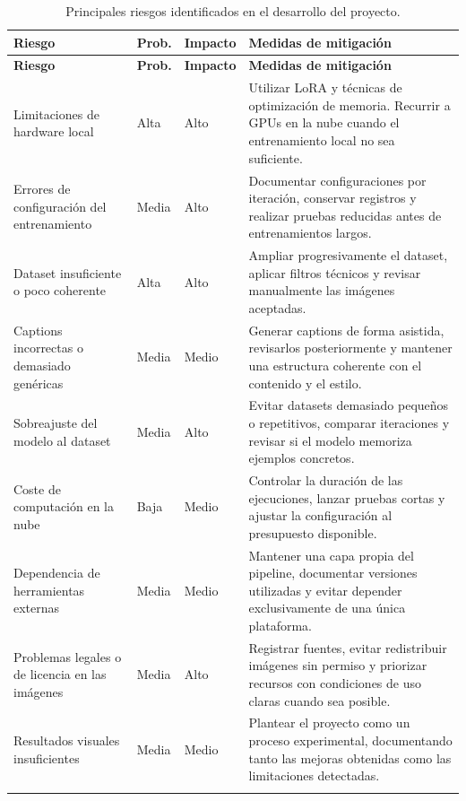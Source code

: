 \documentclass[a4paper,11pt,titlepage]{scrbook}
\newcommand{\estilotabla}{%
    \small
    \setlength{\tabcolsep}{4pt}
    \renewcommand{\arraystretch}{1.15}
}
\begin{document}
\begingroup
\estilotabla
\begin{longtable}{|L{0.25\textwidth}|C{0.12\textwidth}|C{0.12\textwidth}|L{0.39\textwidth}|}
\hline
\textbf{Riesgo} & \textbf{Prob.} & \textbf{Impacto} & \textbf{Medidas de mitigación} \\
\hline
\endfirsthead

\hline
\textbf{Riesgo} & \textbf{Prob.} & \textbf{Impacto} & \textbf{Medidas de mitigación} \\
\hline
\endhead

Limitaciones de hardware local &
Alta &
Alto &
Utilizar LoRA y técnicas de optimización de memoria. Recurrir a GPUs en la nube cuando el entrenamiento local no sea suficiente. \\
\hline

Errores de configuración del entrenamiento &
Media &
Alto &
Documentar configuraciones por iteración, conservar registros y realizar pruebas reducidas antes de entrenamientos largos. \\
\hline

Dataset insuficiente o poco coherente &
Alta &
Alto &
Ampliar progresivamente el dataset, aplicar filtros técnicos y revisar manualmente las imágenes aceptadas. \\
\hline

Captions incorrectas o demasiado genéricas &
Media &
Medio &
Generar captions de forma asistida, revisarlos posteriormente y mantener una estructura coherente con el contenido y el estilo. \\
\hline

Sobreajuste del modelo al dataset &
Media &
Alto &
Evitar datasets demasiado pequeños o repetitivos, comparar iteraciones y revisar si el modelo memoriza ejemplos concretos. \\
\hline

Coste de computación en la nube &
Baja &
Medio &
Controlar la duración de las ejecuciones, lanzar pruebas cortas y ajustar la configuración al presupuesto disponible. \\
\hline

Dependencia de herramientas externas &
Media &
Medio &
Mantener una capa propia del pipeline, documentar versiones utilizadas y evitar depender exclusivamente de una única plataforma. \\
\hline

Problemas legales o de licencia en las imágenes &
Media &
Alto &
Registrar fuentes, evitar redistribuir imágenes sin permiso y priorizar recursos con condiciones de uso claras cuando sea posible. \\
\hline

Resultados visuales insuficientes &
Media &
Medio &
Plantear el proyecto como un proceso experimental, documentando tanto las mejoras obtenidas como las limitaciones detectadas. \\
\hline

\caption{Principales riesgos identificados en el desarrollo del proyecto.}
\label{tab:riesgos}
\end{longtable}
\endgroup
\end{document}
